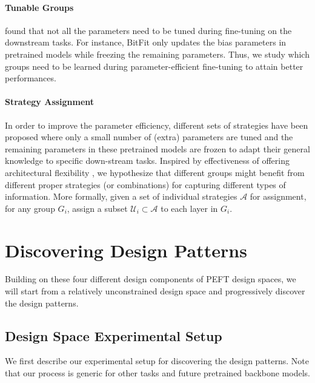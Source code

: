 \paragraph{Tunable Groups} \citet{https://doi.org/10.48550/arxiv.2106.10199} found that not all the parameters need to be tuned during fine-tuning on the downstream tasks. For instance, BitFit \citep{https://doi.org/10.48550/arxiv.2106.10199} only updates the bias parameters in pretrained models while freezing the remaining parameters. Thus, we study which groups need to be learned during parameter-efficient fine-tuning to attain better performances.

\paragraph{Strategy Assignment} In order to improve the parameter efficiency, different sets of strategies \citep{li2021Prefixtuning,lester2021power,pmlr-v97-houlsby19a,https://doi.org/10.48550/arxiv.2106.09685} have been proposed where only a small number of (extra) parameters are tuned and the remaining parameters in these pretrained models are frozen to adapt their general knowledge to specific down-stream tasks. Inspired by effectiveness of offering architectural flexibility \citep{zhang2021beyond,zhang2021self}, we hypothesize that different groups might benefit from different proper strategies (or combinations) for capturing different types of information. More formally, given a set of individual strategies $\mathcal{A}$ for assignment, for any group $G_i$, assign a subset $\mathcal{U}_i \subset \mathcal{A}$ to each layer in $G_i$.

\section{Discovering Design Patterns}\label{Sec:Searching}
Building on these four different design components of PEFT design spaces, we will start from a relatively unconstrained design space and progressively discover the design patterns.

\subsection{Design Space Experimental Setup}
\label{subsec:designspace-exp-setup}

We first describe our experimental setup for discovering the design patterns. Note that our process is generic for other tasks and future pretrained backbone models.

